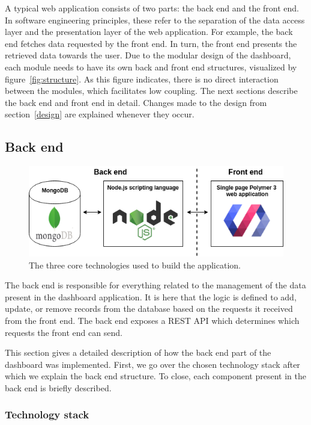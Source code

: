     A typical web application consists of two parts: the back end and the front end. In software engineering principles, these refer to the separation of the data access layer and the presentation layer of the web application. For example, the back end fetches data requested by the front end. In turn, the front end presents the retrieved data towards the user. Due to the modular design of the dashboard, each module needs to have its own back and front end structures, visualized by figure~\ref{fig:structure}. As this figure indicates, there is no direct interaction between the modules, which facilitates low coupling. The next sections describe the back end and front end in detail. Changes made to the design from section~\ref{design} are explained whenever they occur.

    \subsection{Back end}

    \begin{figure}[t]
        \centering
        \includegraphics[width=1\textwidth]{chapters/4_implementation/tech}
        \caption{The three core technologies used to build the application.}\label{fig:tech}
    \end{figure}

    The back end is responsible for everything related to the management of the data present in the dashboard application. It is here that the logic is defined to add, update, or remove records from the database based on the requests it received from the front end. The back end exposes a REST API which determines which requests the front end can send.

    This section gives a detailed description of how the back end part of the dashboard was implemented. First, we go over the chosen technology stack after which we explain the back end structure. To close, each component present in the back end is briefly described.

        \subsubsection{Technology stack}

